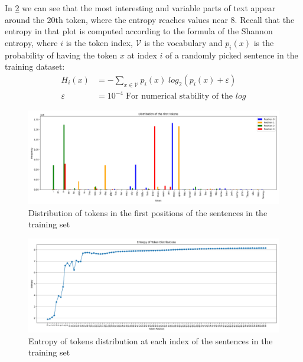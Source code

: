 \documentclass[../thesis.tex]{subfiles}
\begin{document}
In \cref{fig:tinystories_entropy_tokens_index} we can see that the most interesting and variable parts of text appear around the 20th token, where the entropy reaches values near 8.
Recall that the entropy in that plot is computed according to the formula of the Shannon entropy, where $i$ is the token index, $\mathcal{V}$ is the vocabulary and $p_i(x)$ is the probability of having the token $x$ at index $i$ of a randomly picked sentence in the training dataset:
\begin{equation}
\begin{split}
    H_i(x) &= - \sum_{x \in \mathcal{V}} p_i(x) \; log_2(p_i(x) + \varepsilon) \\
    \varepsilon &= 10^{-4} \; \text{For numerical stability of the } log
\end{split}
\label{eq:shannon_entropy}
\end{equation}

\begin{figure}[htbp]
    \centering
    \includegraphics[width=\linewidth]{assets/inverse-lm/first_tokens_distribution.png}
    \caption{Distribution of tokens in the first positions of the sentences in the training set}
    \label{fig:tinystories_first_tokens_distribution}
\end{figure}

\begin{figure}[htbp]
    \centering
    \includegraphics[width=\linewidth]{assets/inverse-lm/entropy_tokens_index.png}
    \caption{Entropy of tokens distribution at each index of the sentences in the training set}
    \label{fig:tinystories_entropy_tokens_index}
\end{figure}
\end{document}
